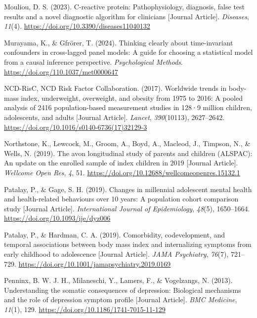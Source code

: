 \documentclass[
  letterpaper,
  DIV=11,
  numbers=noendperiod]{scrreport}
\newlength{\cslhangindent}
\newenvironment{CSLReferences}[2] %
 {\begin{list}{}{%
  \setlength{\itemindent}{0pt}
  \setlength{\leftmargin}{0pt}
  \setlength{\parsep}{0pt}
  \ifodd #1
   \setlength{\leftmargin}{\cslhangindent}
   \setlength{\itemindent}{-1\cslhangindent}
  \fi
  \setlength{\itemsep}{#2\baselineskip}}}
 {\end{list}}
\begin{document}
\begin{CSLReferences}{1}{0}
Mouliou, D. S. (2023). C-reactive protein: Pathophysiology, diagnosis,
false test results and a novel diagnostic algorithm for clinicians
{[}Journal Article{]}. \emph{Diseases}, \emph{11}(4).
\url{https://doi.org/10.3390/diseases11040132}

Murayama, K., \& Gfrörer, T. (2024). Thinking clearly about
time-invariant confounders in cross-lagged panel models: A guide for
choosing a statistical model from a causal inference perspective.
\emph{Psychological Methods}. \url{https://doi.org/110.1037/met0000647}

NCD-RisC, NCD Risk Factor Collaboration. (2017). Worldwide trends in
body-mass index, underweight, overweight, and obesity from 1975 to 2016:
A pooled analysis of 2416 population-based measurement studies in 128·9
million children, adolescents, and adults {[}Journal Article{]}.
\emph{Lancet}, \emph{390}(10113), 2627--2642.
\url{https://doi.org/10.1016/s0140-6736(17)32129-3}

Northstone, K., Lewcock, M., Groom, A., Boyd, A., Macleod, J., Timpson,
N., \& Wells, N. (2019). The avon longitudinal study of parents and
children (ALSPAC): An update on the enrolled sample of index children in
2019 {[}Journal Article{]}. \emph{Wellcome Open Res}, \emph{4}, 51.
\url{https://doi.org/10.12688/wellcomeopenres.15132.1}

Patalay, P., \& Gage, S. H. (2019). Changes in millennial adolescent
mental health and health-related behaviours over 10 years: A population
cohort comparison study {[}Journal Article{]}. \emph{International
Journal of Epidemiology}, \emph{48}(5), 1650--1664.
\url{https://doi.org/10.1093/ije/dyz006}

Patalay, P., \& Hardman, C. A. (2019). Comorbidity, codevelopment, and
temporal associations between body mass index and internalizing symptoms
from early childhood to adolescence {[}Journal Article{]}. \emph{JAMA
Psychiatry}, \emph{76}(7), 721--729.
\url{https://doi.org/10.1001/jamapsychiatry.2019.0169}

Penninx, B. W. J. H., Milaneschi, Y., Lamers, F., \& Vogelzangs, N.
(2013). Understanding the somatic consequences of depression: Biological
mechanisms and the role of depression symptom profile {[}Journal
Article{]}. \emph{BMC Medicine}, \emph{11}(1), 129.
\url{https://doi.org/10.1186/1741-7015-11-129}


\end{CSLReferences}
\end{document}
